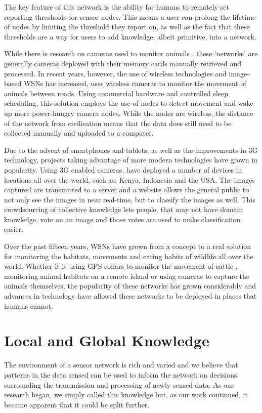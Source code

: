 	The key feature of this network is the ability for humans to remotely set reporting thresholds for sensor nodes. This means a user can prolong the lifetime of nodes by limiting the threshold they report on, as well as the fact that these thresholds are a way for users to add knowledge, albeit primitive, into a network.

	While there is research on cameras used to monitor animals \cite{Kays2009, Ahumada2011a}, these ‘networks’ are generally cameras deployed with their memory cards manually retrieved and processed. In recent years, however, the use of wireless technologies and image-based WSNs has increased, \cite{Garcia-Sanchez2010b} uses wireless cameras to monitor the movement of animals between roads. Using commercial hardware and controlled sleep scheduling, this solution employs the use of nodes to detect movement and wake up more power-hungry camera nodes. While the nodes are wireless, the distance of the network from civilisation means that the data does still need to be collected manually and uploaded to a computer.

	Due to the advent of smartphones and tablets, as well as the improvements in 3G technology, projects taking advantage of more modern technologies have grown in popularity. Using 3G enabled cameras, \cite{ZSL} have deployed a number of devices in locations all over the world, such as: Kenya, Indonesia and the USA. The images captured are transmitted to a server and a website allows the general public to not only see the images in near real-time, but to classify the images as well. This crowdsourcing of collective knowledge lets people, that may not have domain knowledge, vote on an image and those votes are used to make classification easier.

	Over the past fifteen years, WSNs have grown from a concept to a real solution for monitoring the habitats, movements and eating habits of wildlife all over the world. Whether it is using GPS collars to monitor the movement of cattle \cite{Juang2002}, monitoring animal habitats on a remote island or using cameras to capture the animals themselves, the popularity of these networks has grown considerably and advances in technology have allowed these networks to be deployed in places that humans cannot.

\section{Local and Global Knowledge} \label{bg:lgk}
	The environment of a sensor network is rich and varied and we believe that patterns in the data sensed can be used to inform the network on decisions surrounding the transmission and processing of newly sensed data. As our research began, we simply called this knowledge but, as our work continued, it became apparent that it could be split further.

